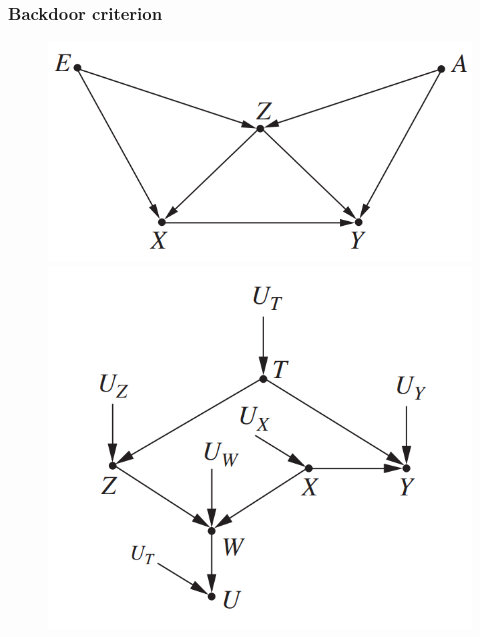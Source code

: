 \documentclass{beamer}
\begin{document}
\begin{frame}
    \frametitle{Backdoor criterion}
    \begin{figure}[htbp]
        \centering
        \begin{minipage}[t]{0.48\textwidth}
        \centering
        \includegraphics[scale=0.6]{fig32.png}
        \end{minipage}
        \begin{minipage}[t]{0.48\textwidth}
        \centering
        \includegraphics[scale=0.6]{fig31.png}
        \end{minipage}
    \end{figure}
\end{frame}
\end{document}
